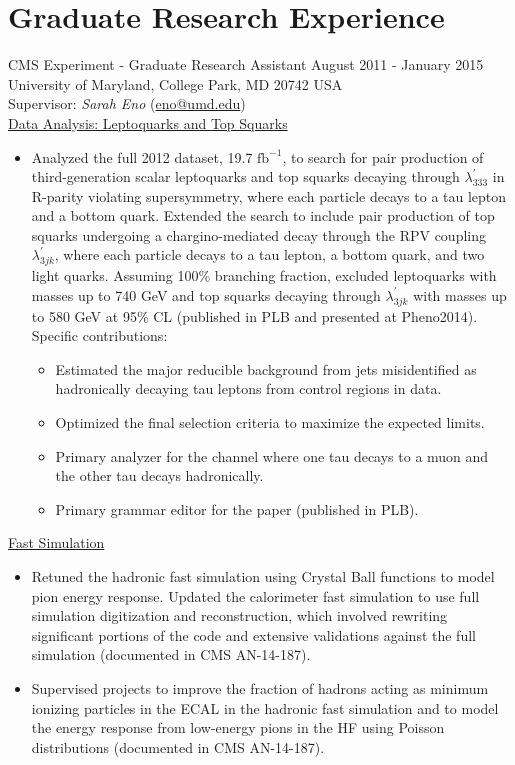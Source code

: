 \setlength{\parskip}{0pt}
\section{Graduate Research Experience}
CMS Experiment - Graduate Research Assistant \hfill August 2011 - January 2015\\
University of Maryland, College Park, MD 20742 USA\\
Supervisor: {\sl Sarah Eno} (\href{mailto:eno@umd.edu}{eno@umd.edu})\\
\underline{Data Analysis: Leptoquarks and Top Squarks}
\begin{itemize}[leftmargin=12pt]
\item Analyzed the full 2012 dataset, 19.7 $\text{fb}^{-1}$, to search for pair production of third-generation scalar leptoquarks and top squarks decaying through $\lambda^{\prime}_{333}$ in R-parity violating supersymmetry, where each particle decays to a tau lepton and a bottom quark. Extended the search to include pair production of top squarks undergoing a chargino-mediated decay through the RPV coupling $\lambda^{\prime}_{3jk}$, where each particle decays to a tau lepton, a bottom quark, and two light quarks. Assuming 100\% branching fraction, excluded leptoquarks with masses up to 740 GeV and top squarks decaying through $\lambda^{\prime}_{3jk}$ with masses up to 580 GeV at 95\% CL (published in PLB and presented at Pheno2014). Specific contributions:
\begin{itemize}
\item Estimated the major reducible background from jets misidentified as hadronically decaying tau leptons from control regions in data.
\item Optimized the final selection criteria to maximize the expected limits.
\item Primary analyzer for the channel where one tau decays to a muon and the other tau decays hadronically.
\item Primary grammar editor for the paper (published in PLB).
\end{itemize}
\end{itemize}
\underline{Fast Simulation}
\begin{itemize}[leftmargin=12pt]
\item Retuned the hadronic fast simulation using Crystal Ball functions to model pion energy response. Updated the calorimeter fast simulation to use full simulation digitization and reconstruction, which involved rewriting significant portions of the code and extensive validations against the full simulation (documented in CMS AN-14-187).
\item Supervised projects to improve the fraction of hadrons acting as minimum ionizing particles in the ECAL in the hadronic fast simulation and to model the energy response from low-energy pions in the HF using Poisson distributions (documented in CMS AN-14-187).
\end{itemize}
